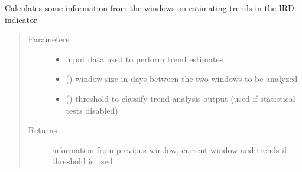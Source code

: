 \documentclass[letterpaper,10pt,english]{sphinxmanual}
\begin{document}
\begin{fulllineitems}
\label{\detokenize{algorithms:algorithms.eti.eti.calc_info_windows_ird}}
\sphinxAtStartPar
Calculates some information from the windows on estimating trends in the IRD indicator.
\begin{quote}\begin{description}
\item[{Parameters}] \leavevmode\begin{itemize}
\item {} 
\sphinxAtStartPar
{} \textendash{} input data used to perform trend estimates

\item {} 
\sphinxAtStartPar
{} () \textendash{} window size in days between the two windows to be analyzed

\item {} 
\sphinxAtStartPar
{} () \textendash{} threshold to classify trend analysis output (used if statistical tests disabled)

\end{itemize}

\item[{Returns}] \leavevmode
\sphinxAtStartPar
information from previous window, current window and trends if threshold is used

\end{description}\end{quote}

\end{fulllineitems}

\end{document}
